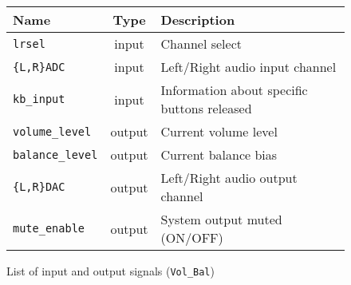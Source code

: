 \begin{figure}[h]
  \centering
  \caption{List of input and output signals (\texttt{Vol\_Bal})}
  \begin{tabular}{|l|c|l|}
    \hline
    Name & Type & Description \\    \hline
    \verb+lrsel+ & input & Channel select \\    \hline
    \verb+{L,R}ADC+ & input & Left/Right audio input channel \\    \hline
    \verb+kb_input+ & input & Information about specific buttons released \\    \hline
%
    \verb+volume_level+ & output & Current volume level \\    \hline
    \verb+balance_level+ & output & Current balance bias \\    \hline
    \verb+{L,R}DAC+ & output & Left/Right audio output channel \\    \hline
    \verb+mute_enable+ & output & System output muted (ON/OFF) \\    \hline
  \end{tabular}
  \label{tab:volbalsig}
\end{figure}